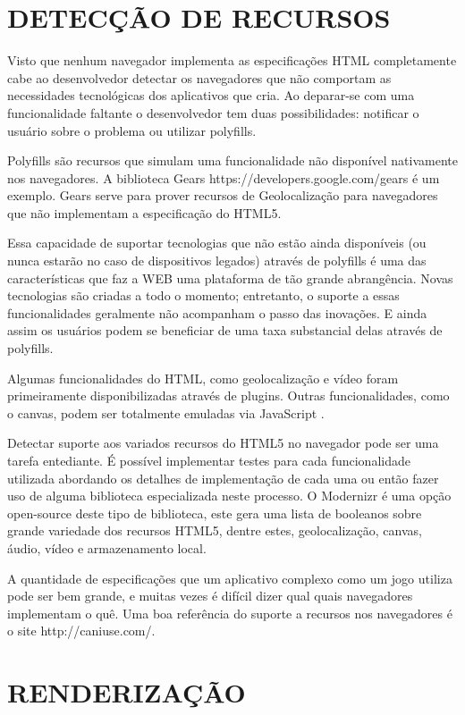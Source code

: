 \section{DETECÇÃO DE RECURSOS}
Visto que nenhum navegador implementa as especificações HTML
completamente cabe ao desenvolvedor detectar os navegadores que não
comportam as necessidades tecnológicas dos aplicativos que cria. Ao
deparar-se com uma funcionalidade faltante o desenvolvedor tem duas
possibilidades: notificar o usuário sobre o problema ou utilizar
polyfills.

Polyfills são recursos que simulam uma funcionalidade não
disponível nativamente nos navegadores. A biblioteca Gears
https://developers.google.com/gears é um exemplo. Gears
serve para prover recursos de Geolocalização para navegadores que
não implementam a especificação do HTML5. 

Essa capacidade de suportar tecnologias que não estão ainda
disponíveis (ou nunca estarão no caso de dispositivos legados)
através de polyfills é uma das características que faz a WEB uma
plataforma de tão grande abrangência. Novas tecnologias são criadas a
todo o momento; entretanto, o suporte a essas funcionalidades geralmente
não acompanham o passo das inovações. E ainda assim os usuários
podem se beneficiar de uma taxa substancial delas através de polyfills.

Algumas funcionalidades do HTML, como geolocalização e vídeo
foram primeiramente disponibilizadas através de plugins. Outras
funcionalidades, como o canvas, podem ser totalmente emuladas via
JavaScript \autocite{diveIntohtml}.

Detectar suporte aos variados recursos do HTML5 no navegador
pode ser uma tarefa entediante. É possível implementar testes para
cada funcionalidade utilizada abordando os detalhes de implementação
de cada uma ou então fazer uso de alguma biblioteca especializada
neste processo. O Modernizr é uma opção open-source deste tipo de
biblioteca, este gera uma lista de booleanos sobre grande variedade dos
recursos HTML5, dentre estes, geolocalização, canvas, áudio, vídeo e
armazenamento local.

A quantidade de especificações que um aplicativo complexo como um jogo
utiliza pode ser bem grande, e muitas vezes é difícil dizer qual quais
navegadores implementam o quê. Uma boa referência do suporte a recursos
nos navegadores é o site http://caniuse.com/.

\section{RENDERIZAÇÃO}

